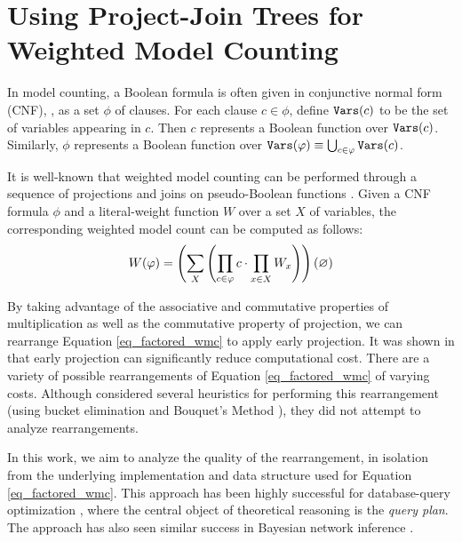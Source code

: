 \section{Using Project-Join Trees for Weighted Model Counting}
\label{sec_jointree}

In model counting, a Boolean formula is often given in conjunctive normal form (CNF), \ie, as a set $\phi$ of clauses.
For each clause $c \in \phi$, define $\texttt{\upshape Vars}(c)$ to be the set of variables appearing in $c$.
Then $c$ represents a Boolean function over $\texttt{\upshape Vars}(c)$. Similarly, $\phi$ represents a Boolean function over $\texttt{\upshape Vars}(\varphi) \equiv \bigcup_{c \in \varphi} \texttt{\upshape Vars}(c)$.

It is well-known that weighted model counting can be performed through a sequence of projections and joins on pseudo-Boolean functions \cite{dudek2020addmc,dudek2019efficient}.
Given a CNF formula $\phi$ and a literal-weight function $W$ over a set $X$ of variables, the corresponding weighted model count can be computed as follows:
\begin{equation}
\label{eq_factored_wmc}
    W(\varphi) = \left( 
        \sum_X
        \left( \prod_{c \in \varphi} c \cdot \prod_{x \in X} W_x \right)
     \right)(\varnothing)
\end{equation}

By taking advantage of the associative and commutative properties of multiplication as well as the commutative property of projection, we can rearrange Equation \eqref{eq_factored_wmc} to apply early projection.
It was shown in \cite{dudek2020addmc} that early projection can significantly reduce computational cost.
There are a variety of possible rearrangements of Equation \eqref{eq_factored_wmc} of varying costs.
Although \cite{dudek2020addmc} considered several heuristics for performing this rearrangement (using bucket elimination \cite{dechter1999bucket} and Bouquet's Method \cite{bouquet1999gestion}), they did not attempt to analyze rearrangements.

In this work, we aim to analyze the quality of the rearrangement, in isolation from the underlying implementation and data structure used for Equation \eqref{eq_factored_wmc}.
This approach has been highly successful for database-query optimization \cite{mcmahan2004projection}, where the central object of theoretical reasoning is the \emph{query plan}.
The approach has also seen similar success in Bayesian network inference \cite{darwiche1998dynamic}.

